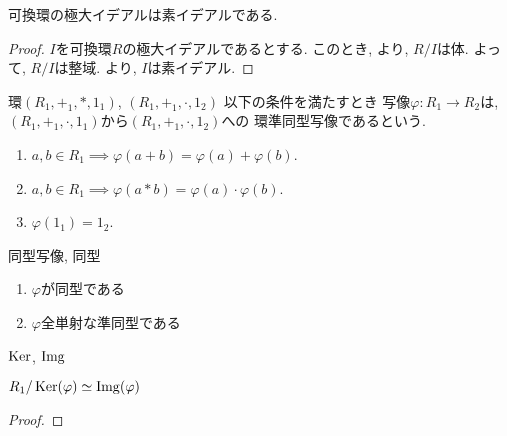   \begin{theorem}
    可換環の極大イデアルは素イデアルである.
  \end{theorem}
  \begin{proof}
    $I$を可換環$R$の極大イデアルであるとする.
    このとき,
    より, $R/I$は体.
    よって, $R/I$は整域.
    より, $I$は素イデアル.
  \end{proof}

  \begin{definition}
    環$(R_1,+_1,\ast, 1_1)$, $(R_1,+_1,\cdot,1_2 )$
    以下の条件を満たすとき
    写像$\varphi\colon R_1 \to R_2$は,
    $(R_1,+_1,\cdot, 1_1)$から$(R_1,+_1,\cdot,1_2 )$への
    環準同型写像であるという.
    \begin{enumerate}
    \item $a,b\in R_1\implies \varphi(a+b)=\varphi(a)+\varphi(b)$.
    \item $a,b\in R_1\implies \varphi(a\ast b)=\varphi(a)\cdot\varphi(b)$.
    \item $\varphi(1_1)=1_2$.
    \end{enumerate}
  \end{definition}
  \begin{definition}
    同型写像, 同型
  \end{definition}
  \begin{proposition}
    \begin{enumerate}
    \item $\varphi$が同型である
    \item $\varphi$全単射な準同型である
    \end{enumerate}
  \end{proposition}
  
  \begin{definition}
    $\operatorname{Ker}$, $\operatorname{Img}$
  \end{definition}
  \begin{theorem}
    $R_1/\operatorname{Ker}(\varphi)\simeq \operatorname{Img}(\varphi)$
  \end{theorem}
  \begin{proof}\end{proof}


